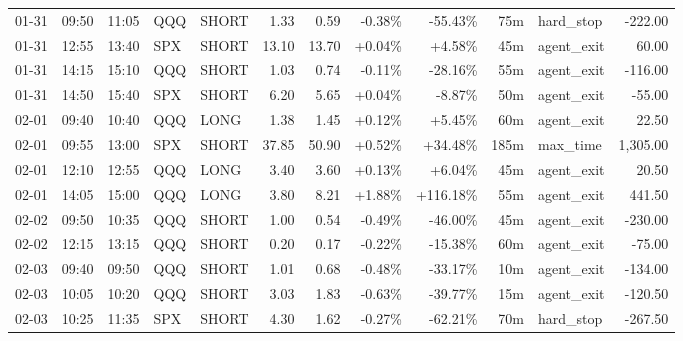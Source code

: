 \documentclass[11pt,a4paper,twoside]{article}
\begin{document}
\begin{center}
\begin{longtable}{>{\color{txtmain}}l l l l l r r r r r >{\color{txtmain}}l r}
01-31 & 09:50 & 11:05 & QQQ & SHORT & 1.33 & 0.59 & \textcolor{lossred}{-0.38\%} & \textcolor{lossred}{-55.43\%} & 75m & hard\_stop & \textcolor{lossred}{-222.00} \\
01-31 & 12:55 & 13:40 & SPX & SHORT & 13.10 & 13.70 & \textcolor{wingreen}{+0.04\%} & \textcolor{wingreen}{+4.58\%} & 45m & agent\_exit & \textcolor{wingreen}{60.00} \\
01-31 & 14:15 & 15:10 & QQQ & SHORT & 1.03 & 0.74 & \textcolor{lossred}{-0.11\%} & \textcolor{lossred}{-28.16\%} & 55m & agent\_exit & \textcolor{lossred}{-116.00} \\
01-31 & 14:50 & 15:40 & SPX & SHORT & 6.20 & 5.65 & \textcolor{wingreen}{+0.04\%} & \textcolor{lossred}{-8.87\%} & 50m & agent\_exit & \textcolor{lossred}{-55.00} \\
02-01 & 09:40 & 10:40 & QQQ & LONG & 1.38 & 1.45 & \textcolor{wingreen}{+0.12\%} & \textcolor{wingreen}{+5.45\%} & 60m & agent\_exit & \textcolor{wingreen}{22.50} \\
02-01 & 09:55 & 13:00 & SPX & SHORT & 37.85 & 50.90 & \textcolor{wingreen}{+0.52\%} & \textcolor{wingreen}{+34.48\%} & 185m & max\_time & \textcolor{wingreen}{1,305.00} \\
02-01 & 12:10 & 12:55 & QQQ & LONG & 3.40 & 3.60 & \textcolor{wingreen}{+0.13\%} & \textcolor{wingreen}{+6.04\%} & 45m & agent\_exit & \textcolor{wingreen}{20.50} \\
02-01 & 14:05 & 15:00 & QQQ & LONG & 3.80 & 8.21 & \textcolor{wingreen}{+1.88\%} & \textcolor{wingreen}{+116.18\%} & 55m & agent\_exit & \textcolor{wingreen}{441.50} \\
02-02 & 09:50 & 10:35 & QQQ & SHORT & 1.00 & 0.54 & \textcolor{lossred}{-0.49\%} & \textcolor{lossred}{-46.00\%} & 45m & agent\_exit & \textcolor{lossred}{-230.00} \\
02-02 & 12:15 & 13:15 & QQQ & SHORT & 0.20 & 0.17 & \textcolor{lossred}{-0.22\%} & \textcolor{lossred}{-15.38\%} & 60m & agent\_exit & \textcolor{lossred}{-75.00} \\
02-03 & 09:40 & 09:50 & QQQ & SHORT & 1.01 & 0.68 & \textcolor{lossred}{-0.48\%} & \textcolor{lossred}{-33.17\%} & 10m & agent\_exit & \textcolor{lossred}{-134.00} \\
02-03 & 10:05 & 10:20 & QQQ & SHORT & 3.03 & 1.83 & \textcolor{lossred}{-0.63\%} & \textcolor{lossred}{-39.77\%} & 15m & agent\_exit & \textcolor{lossred}{-120.50} \\
02-03 & 10:25 & 11:35 & SPX & SHORT & 4.30 & 1.62 & \textcolor{lossred}{-0.27\%} & \textcolor{lossred}{-62.21\%} & 70m & hard\_stop & \textcolor{lossred}{-267.50} \\

\end{longtable}
\end{center}
\end{document}

